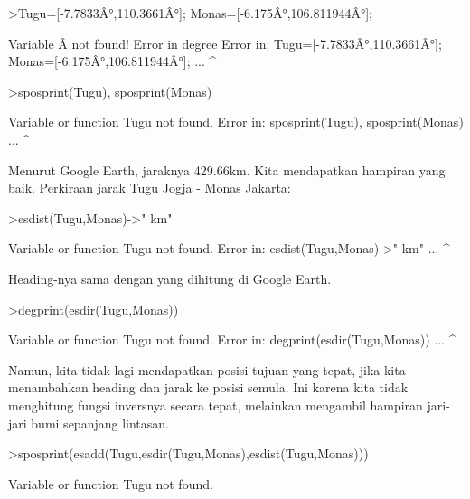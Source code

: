 \documentclass[a4paper,10pt]{article}
\begin{document}
\begin{eulernotebook}
\begin{eulercomment}
\begin{eulercomment}
\begin{eulercomment}
\begin{eulercomment}
\begin{eulercomment}
\begin{eulercomment}
\begin{eulercomment}
\begin{eulercomment}
\begin{eulercomment}
\begin{eulercomment}
\begin{eulercomment}
\begin{eulercomment}
\begin{eulercomment}
\begin{eulercomment}
\begin{eulercomment}
\begin{eulercomment}
\begin{eulercomment}
\begin{eulercomment}
\begin{eulerprompt}
>Tugu=[-7.7833Â°,110.3661Â°]; Monas=[-6.175Â°,106.811944Â°];
\end{eulerprompt}
\begin{euleroutput}
  Variable Â not found!
  Error in degree
  Error in:
  Tugu=[-7.7833Â°,110.3661Â°]; Monas=[-6.175Â°,106.811944Â°]; ...
                 ^
\end{euleroutput}
\begin{eulerprompt}
>sposprint(Tugu), sposprint(Monas)
\end{eulerprompt}
\begin{euleroutput}
  Variable or function Tugu not found.
  Error in:
  sposprint(Tugu), sposprint(Monas) ...
                ^
\end{euleroutput}
\begin{eulercomment}
Menurut Google Earth, jaraknya 429.66km. Kita mendapatkan hampiran yang baik.
Perkiraan jarak Tugu Jogja - Monas Jakarta:
\end{eulercomment}
\begin{eulerprompt}
>esdist(Tugu,Monas)->" km"
\end{eulerprompt}
\begin{euleroutput}
  Variable or function Tugu not found.
  Error in:
  esdist(Tugu,Monas)->" km" ...
             ^
\end{euleroutput}
\begin{eulercomment}
Heading-nya sama dengan yang dihitung di Google Earth.
\end{eulercomment}
\begin{eulerprompt}
>degprint(esdir(Tugu,Monas))
\end{eulerprompt}
\begin{euleroutput}
  Variable or function Tugu not found.
  Error in:
  degprint(esdir(Tugu,Monas)) ...
                     ^
\end{euleroutput}
\begin{eulercomment}
Namun, kita tidak lagi mendapatkan posisi tujuan yang tepat, jika kita menambahkan heading dan
jarak ke posisi semula. Ini karena kita tidak menghitung fungsi inversnya secara tepat, melainkan
mengambil hampiran jari-jari bumi sepanjang lintasan.
\end{eulercomment}
\begin{eulerprompt}
>sposprint(esadd(Tugu,esdir(Tugu,Monas),esdist(Tugu,Monas)))
\end{eulerprompt}
\begin{euleroutput}
  Variable or function Tugu not found.

\end{euleroutput}
\end{eulercomment}
\end{eulercomment}
\end{eulercomment}
\end{eulercomment}
\end{eulercomment}
\end{eulercomment}
\end{eulercomment}
\end{eulercomment}
\end{eulercomment}
\end{eulercomment}
\end{eulercomment}
\end{eulercomment}
\end{eulercomment}
\end{eulercomment}
\end{eulercomment}
\end{eulercomment}
\end{eulercomment}
\end{eulercomment}
\end{eulernotebook}
\end{document}
